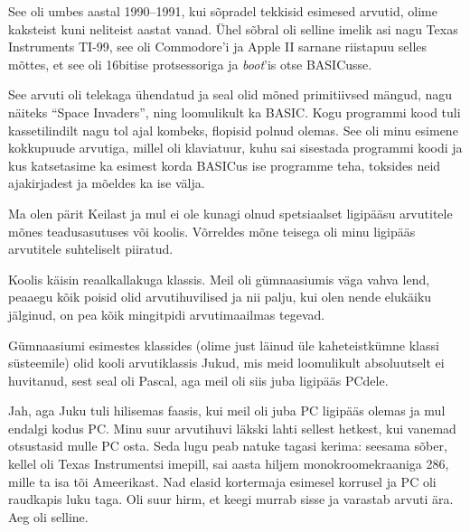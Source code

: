 See oli umbes aastal 1990--1991, kui sõpradel tekkisid esimesed arvutid, 
olime kaksteist kuni neliteist aastat vanad. Ühel sõbral oli selline 
imelik asi nagu Texas Instruments TI-99, see oli Commodore'i ja Apple 
II sarnane riistapuu selles mõttes, et see oli 16bitise protsessoriga ja 
\emph{boot}'is otse BASICusse. 

See arvuti oli telekaga ühendatud ja seal olid mõned primitiivsed mängud, nagu näiteks 
\enquote{Space Invaders}, ning 
loomulikult ka BASIC. Kogu programmi kood tuli kassetilindilt nagu tol 
ajal kombeks, flopisid polnud olemas. See oli minu esimene kokkupuude 
arvutiga, millel oli klaviatuur, kuhu sai sisestada programmi koodi ja 
kus katsetasime ka esimest korda BASICus ise programme teha, toksides 
neid ajakirjadest ja mõeldes ka ise välja. 


Ma olen pärit Keilast ja mul ei ole kunagi olnud 
spetsiaalset ligipääsu arvutitele mõnes teadusasutuses või koolis. Võrreldes mõne teisega oli minu ligipääs arvutitele suhteliselt piiratud.


Koolis käisin reaalkallakuga klassis. Meil oli 
gümnaasiumis väga vahva lend, peaaegu kõik poisid olid 
arvutihuvilised ja nii palju, kui olen nende elukäiku jälginud, on 
pea kõik mingitpidi arvutimaailmas tegevad.


Gümnaasiumi esimestes klassides (olime just 
läinud üle kaheteistkümne klassi süsteemile) olid kooli arvutiklassis 
Jukud, mis meid loomulikult absoluutselt ei huvitanud, sest
seal oli Pascal, aga meil oli siis juba ligipääs PCdele.


Jah, aga Juku tuli hilisemas faasis, kui meil oli 
juba PC ligipääs olemas ja mul endalgi kodus PC. Minu 
suur arvutihuvi läkski lahti sellest hetkest, kui vanemad otsustasid mulle 
PC osta. Seda lugu peab natuke tagasi kerima: seesama sõber, 
kellel oli Texas Instrumentsi imepill, sai aasta hiljem monokroomekraaniga
286, mille ta isa tõi Ameerikast. Nad elasid
kortermaja esimesel korrusel ja PC oli raudkapis luku taga. Oli suur hirm, et 
keegi murrab sisse ja varastab arvuti ära. Aeg oli selline.

